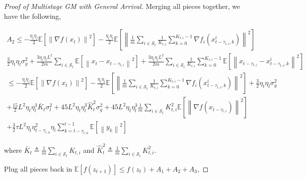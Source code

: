 \begin{proof}[Proof of Multistage GM with General Arrival]
Merging all pieces together, we have the following,

\begin{equation}
\begin{gathered}
A_2 \leq - \frac{\eta_t\eta_l}{2} \mathbb{E}\left[\left\| \nabla f(x_t) \right\|^2\right] - \frac{\eta_t\eta_l}{2} \mathbb{E}\left[\left\| \frac{1}{m}\sum_{i\in\mathcal{S}_t} \frac{1}{K_{t,i}} \sum_{k=0}^{K_{t,i}-1} \nabla f_i(x_{t-\tau_{t,i},k}^i) \right\|^2\right] \\
\frac{3}{2} \eta_t\eta_l \sigma_g^2 +  \frac{3\eta_t\eta_l L^2}{2m} \sum_{i\in\mathcal{S}_t} \mathbb{E}\left[\left\|  x_t  - x_{t-\tau_{t,i}} \right\|^2\right] + \frac{3 \eta_t \eta_l L^2}{2 m} \sum_{i\in\mathcal{S}_t} \frac{1}{K_{t,i}} \sum_{k=0}^{K_{t,i}-1} \mathbb{E}\left[\left\|    x_{t-\tau_{t,i}}  -  x_{t-\tau_{t,i},k}^i \right\|^2\right]\\
\leq - \frac{\eta_t\eta_l}{2} \mathbb{E}\left[\left\| \nabla f(x_t) \right\|^2\right] - \frac{\eta_t\eta_l}{2} \mathbb{E}\left[\left\| \frac{1}{m}\sum_{i\in\mathcal{S}_t} \frac{1}{K_{t,i}} \sum_{k=0}^{K_{t,i}-1} \nabla f_i(x_{t-\tau_{t,i},k}^i) \right\|^2\right] 
+ \frac{3}{2} \eta_t\eta_l \sigma_g^2 \\
+ \frac{15}{2}L^2\eta_t\eta_l^3\bar{K}_t\sigma_l^2+45L^2\eta_t\eta_l^3\hat{K}_t^2\sigma_g^2+45L^2\eta_t\eta_l^3 \frac{1}{m}\sum_{i\in\mathcal{S}_t}K_{t,i}^2\mathbb{E}\left[\left\| \nabla f(x_{t-\tau_{t,i}})\right\|^2\right]\\
+\frac{3}{2}\tau L^2\eta_t\eta_{t-\tau_{t,u}}^2\eta_l \sum_{k=t-\tau_{t,u}}^{t-1}\mathbb{E}\left[\left\|  y_k \right\|^2\right]
\end{gathered}\nonumber
\end{equation}

where $\bar{K}_t\triangleq \frac{1}{m}\sum_{i\in\mathcal{S}_t}K_{t,i}$ and $\hat{K}_t^2 \triangleq \frac{1}{m}\sum_{i\in\mathcal{S}_t}K^2_{t,i}$.

Plug all pieces back in $\mathbb{E}\left[f(z_{t+1})\right] \leq f(z_t) + A_1 + A_2 + A_3$,


\end{proof}
